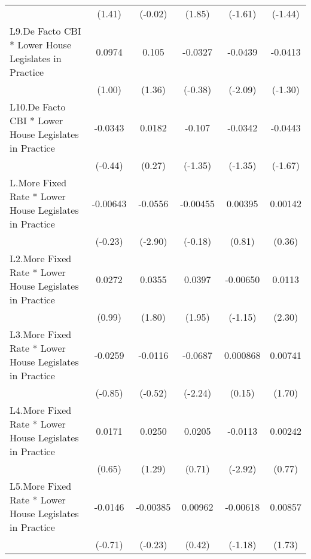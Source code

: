 {\begin{longtable}{l*{5}{c}}
                &   (1.41)         &  (-0.02)         &   (1.85)         &  (-1.61)         &  (-1.44)         \\
\addlinespace
L9.De Facto CBI * Lower House Legislates in Practice&   0.0974         &    0.105         &  -0.0327         &  -0.0439\sym{*}  &  -0.0413         \\
                &   (1.00)         &   (1.36)         &  (-0.38)         &  (-2.09)         &  (-1.30)         \\
\addlinespace
L10.De Facto CBI * Lower House Legislates in Practice&  -0.0343         &   0.0182         &   -0.107         &  -0.0342         &  -0.0443         \\
                &  (-0.44)         &   (0.27)         &  (-1.35)         &  (-1.35)         &  (-1.67)         \\
\addlinespace
L.More Fixed Rate * Lower House Legislates in Practice& -0.00643         &  -0.0556\sym{**} & -0.00455         &  0.00395         &  0.00142         \\
                &  (-0.23)         &  (-2.90)         &  (-0.18)         &   (0.81)         &   (0.36)         \\
\addlinespace
L2.More Fixed Rate * Lower House Legislates in Practice&   0.0272         &   0.0355         &   0.0397         & -0.00650         &   0.0113\sym{*}  \\
                &   (0.99)         &   (1.80)         &   (1.95)         &  (-1.15)         &   (2.30)         \\
\addlinespace
L3.More Fixed Rate * Lower House Legislates in Practice&  -0.0259         &  -0.0116         &  -0.0687\sym{*}  & 0.000868         &  0.00741         \\
                &  (-0.85)         &  (-0.52)         &  (-2.24)         &   (0.15)         &   (1.70)         \\
\addlinespace
L4.More Fixed Rate * Lower House Legislates in Practice&   0.0171         &   0.0250         &   0.0205         &  -0.0113\sym{**} &  0.00242         \\
                &   (0.65)         &   (1.29)         &   (0.71)         &  (-2.92)         &   (0.77)         \\
\addlinespace
L5.More Fixed Rate * Lower House Legislates in Practice&  -0.0146         & -0.00385         &  0.00962         & -0.00618         &  0.00857         \\
                &  (-0.71)         &  (-0.23)         &   (0.42)         &  (-1.18)         &   (1.73)         \\

\end{longtable}}
